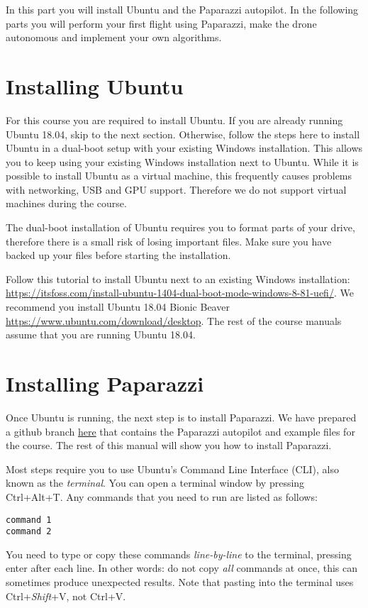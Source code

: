 \documentclass{article}
\begin{document}

In this part you will install Ubuntu and the Paparazzi autopilot.
In the following parts you will perform your first flight using Paparazzi, make the drone autonomous and implement your own algorithms.


\section{Installing Ubuntu}
For this course you are required to install Ubuntu.
If you are already running Ubuntu 18.04, skip to the next section.
Otherwise, follow the steps here to install Ubuntu in a dual-boot setup with your existing Windows installation.
This allows you to keep using your existing Windows installation next to Ubuntu.
While it is possible to install Ubuntu as a virtual machine, this frequently causes problems with networking, USB and GPU support. Therefore we do not support virtual machines during the course.

The dual-boot installation of Ubuntu requires you to format parts of your drive, therefore there is a small risk of losing important files.
Make sure you have backed up your files before starting the installation.

Follow this tutorial to install Ubuntu next to an existing Windows installation: \url{https://itsfoss.com/install-ubuntu-1404-dual-boot-mode-windows-8-81-uefi/}. We recommend you install Ubuntu 18.04 Bionic Beaver \url{https://www.ubuntu.com/download/desktop}. The rest of the course manuals assume that you are running Ubuntu 18.04.



\section{Installing Paparazzi}
Once Ubuntu is running, the next step is to install Paparazzi.
We have prepared a github branch \href{https://github.com/tudelft/paparazzi/tree/mavlabCourse2019}{here} that contains the Paparazzi autopilot and example files for the course. The rest of this manual will show you how to install Paparazzi.

Most steps require you to use Ubuntu's Command Line Interface (CLI), also known as the \emph{terminal}. You can open a terminal window by pressing Ctrl+Alt+T. Any commands that you need to run are listed as follows:
\begin{lstlisting}[style=Bash]
command 1
command 2
\end{lstlisting}
You need to type or copy these commands \emph{line-by-line} to the terminal, pressing enter after each line. In other words: do not copy \emph{all} commands at once, this can sometimes produce unexpected results. Note that pasting into the terminal uses Ctrl+\emph{Shift}+V, not Ctrl+V.
\end{document}
